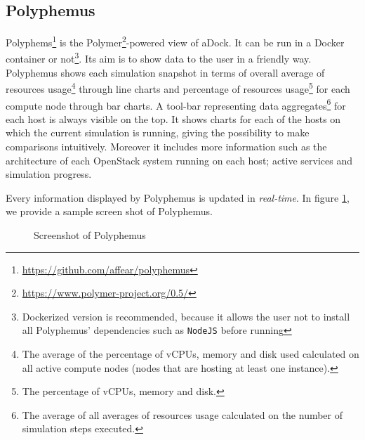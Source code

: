 \subsection{Polyphemus}
\label{sub:polyphemus}
Polyphems\footnote{\url{https://github.com/affear/polyphemus}} is the Polymer\footnote{\url{https://www.polymer-project.org/0.5/}}-powered view of aDock. It can be run in a Docker container or not\footnote{Dockerized version is recommended, because it allows the user not to install all Polyphemus' dependencies such as \texttt{NodeJS} before running}. Its aim is to show data to the user in a friendly way. Polyphemus shows each simulation snapshot in terms of overall average of resources usage\footnote{The average of the percentage of vCPUs, memory and disk used calculated on all active compute nodes (nodes that are hosting at least one instance).} through line charts and percentage of resources usage\footnote{The percentage of vCPUs, memory and disk.} for each compute node through bar charts. A tool-bar representing data aggregates\footnote{The average of all averages of resources usage calculated on the number of simulation steps executed.} for each host is always visible on the top. It shows charts for each of the hosts on which the current simulation is running, giving the possibility to make comparisons intuitively. Moreover it includes more information such as the architecture of each OpenStack system running on each host; active services and simulation progress.

Every information displayed by Polyphemus is updated in \textit{real-time}. In figure \ref{fig:poly}, we provide a sample screen shot of Polyphemus. 

\begin{figure}[H]
\label{fig:poly}
\caption{Screenshot of Polyphemus}
\end{figure}